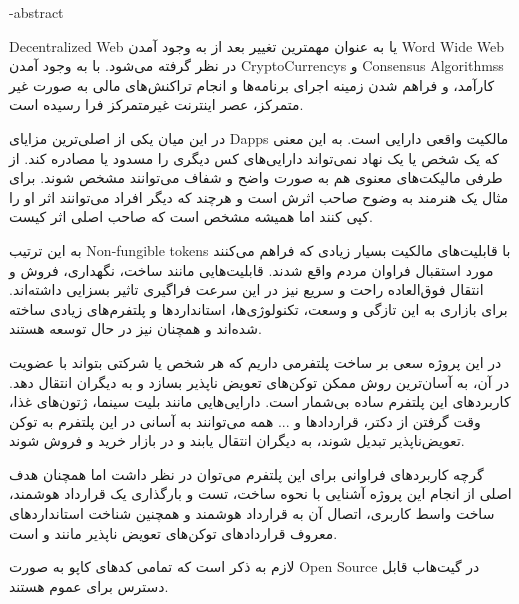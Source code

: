 



\fa-abstract{
\gls{Decentralized Web}
یا
 به عنوان مهمترین تغییر بعد از به وجود آمدن
\gls{Word Wide Web}
 در نظر گرفته می‌شود. با به وجود آمدن
\glspl{CryptoCurrency}
و
\glspl{Consensus Algorithms}
کارآمد، و فراهم شدن زمینه اجرای برنامه‌ها و انجام تراکنش‌های مالی به صورت غیر متمرکز، عصر اینترنت غیرمتمرکز فرا رسیده است.

در این میان یکی از اصلی‌ترین مزایای 
\glspl{Dapp}
مالکیت واقعی دارایی است.
به این معنی که یک شخص یا یک نهاد نمی‌تواند دارایی‌های کس دیگری را مسدود یا مصادره کند.
از طرفی مالیکت‌های معنوی هم به صورت واضح و شفاف می‌توانند مشخص شوند.
برای مثال یک هنرمند به وضوح صاحب اثرش است و هرچند که دیگر افراد می‌توانند اثر او را کپی کنند اما همیشه مشخص است که صاحب اصلی اثر کیست.

به این ترتیب 
\glspl{Non-fungible token}
با قابلیت‌های مالکیت بسیار زیادی که فراهم می‌کنند مورد استقبال فراوان مردم واقع شدند. قابلیت‌هایی مانند ساخت، نگهداری، فروش و انتقال فوق‌العاده راحت و سریع نیز در این سرعت فراگیری تاثیر بسزایی داشته‌اند.
برای بازاری به این تازگی و وسعت، تکنولوژی‌ها، استاندارد‌ها و پلتفرم‌های زیادی ساخته شده‌اند و همچنان نیز در حال توسعه هستند.

در این پروژه سعی بر ساخت پلتفرمی داریم که هر شخص یا شرکتی بتواند با عضویت در آن، به آسان‌ترین روش ممکن توکن‌های تعویض ناپذیر‌ بسازد و به دیگران انتقال دهد.
کاربرد‌های این پلتفرم ساده بی‌شمار است. دارایی‌هایی مانند بلیت سینما، ژتون‌های غذا، وقت گرفتن از دکتر، قراردادها و ... همه می‌توانند به آسانی در این پلتفرم به توکن تعویض‌ناپذیر تبدیل شوند، به دیگران انتقال یابند و در بازار خرید و فروش شوند.

گرچه کاربردهای فراوانی برای این پلتفرم می‌توان در نظر داشت اما همچنان هدف اصلی از انجام این پروژه آشنایی با نحوه ساخت، تست و بارگذاری یک قرارداد هوشمند،
ساخت واسط کاربری، اتصال آن به قرارداد هوشمند و همچنین شناخت استاندارد‌های معروف قرارداد‌های توکن‌های تعویض ناپذیر مانند
و
است.

لازم به ذکر است که تمامی کدهای کاپو به صورت
\gls{Open Source}
در 
گیت‌هاب
قابل دسترس برای عموم هستند.
}
